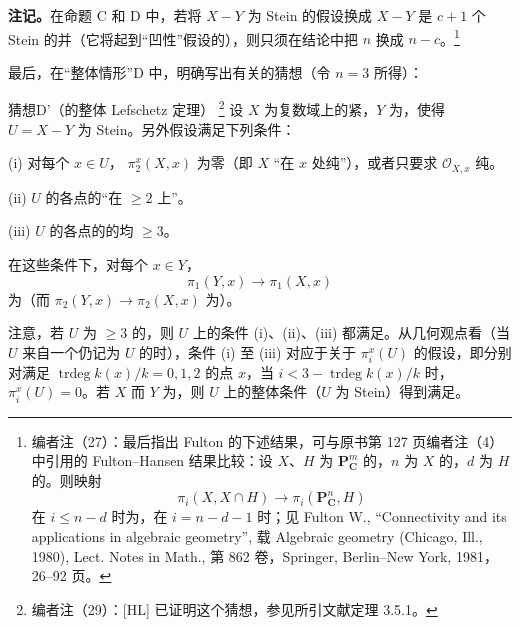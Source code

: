 \textbf{注记。}在命题 C 和 D 中，若将 $X-Y$ 为 Stein 的假设换成 $X-Y$ 是 $c+1$ 个 Stein 的并（它将起到“凹性”假设的），则只须在结论中把 $n$ 换成 $n-c$。\footnote{编者注（27）：最后指出 Fulton 的下述结果，可与原书第 127 页编者注（4）中引用的 Fulton--Hansen 结果比较：设 $X$、$H$ 为 $\mathbf P^m_{\mathbf C}$ 的，$n$ 为 $X$ 的，$d$ 为 $H$ 的。则映射
\[
\pi_i(X,X\cap H)\longrightarrow\pi_i(\mathbf P^n_{\mathbf C},H)
\]
在 $i\leq n-d$ 时为，在 $i=n-d-1$ 时；见 Fulton W., “Connectivity and its applications in algebraic geometry”, 载 Algebraic geometry (Chicago, Ill., 1980), Lect. Notes in Math., 第 862 卷，Springer, Berlin--New York, 1981，26--92 页。}

最后，在“整体情形”D 中，明确写出有关的猜想（令 $n=3$ 所得）：

\begin{SGAresult}{猜想}{D'（的整体 Lefschetz 定理）}
\footnote{编者注（29）：[HL] 已证明这个猜想，参见所引文献定理 3.5.1。}
设 $X$ 为复数域上的紧，$Y$ 为，使得 $U=X-Y$ 为 Stein。另外假设满足下列条件：

(i) 对每个 $x\in U$， $\pi_2^x(X,x)$ 为零（即 $X$ “在 $x$ 处纯”），或者只要求 $\mathcal O_{X,x}$ 纯。

(ii) $U$ 的各点的“在 $\geq2$ 上”。

(iii) $U$ 的各点的的均 $\geq3$。

在这些条件下，对每个 $x\in Y$，
\[
\pi_1(Y,x)\longrightarrow\pi_1(X,x)
\]
为（而 $\pi_2(Y,x)\to\pi_2(X,x)$ 为）。
\end{SGAresult}

注意，若 $U$ 为 $\geq3$ 的，则 $U$ 上的条件 (i)、(ii)、(iii) 都满足。从几何观点看（当 $U$ 来自一个仍记为 $U$ 的时），条件 (i) 至 (iii) 对应于关于 $\pi_i^x(U)$ 的假设，即分别对满足 $\operatorname{trdeg}k(x)/k=0,1,2$ 的点 $x$，当 $i<3-\operatorname{trdeg}k(x)/k$ 时，$\pi_i^x(U)=0$。若 $X$ 而 $Y$ 为，则 $U$ 上的整体条件（$U$ 为 Stein）得到满足。

